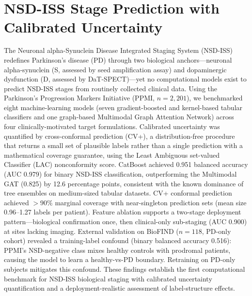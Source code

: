 
\chapter{NSD-ISS Stage Prediction with Calibrated Uncertainty}
\label{ch:paper1}\label{p1:ch:paper1}

The Neuronal alpha-Synuclein Disease Integrated Staging System (NSD-ISS) redefines Parkinson's disease (PD) through two biological anchors---neuronal alpha-synuclein (S, assessed by seed amplification assay) and dopaminergic dysfunction (D, assessed by DaT-SPECT)---yet no computational models exist to predict NSD-ISS stages from routinely collected clinical data. Using the Parkinson's Progression Markers Initiative (PPMI, $n{=}2{,}201$), we benchmarked eight machine-learning models (seven gradient-boosted and kernel-based tabular classifiers and one graph-based Multimodal Graph Attention Network) across four clinically-motivated target formulations. Calibrated uncertainty was quantified by cross-conformal prediction (CV+), a distribution-free procedure that returns a small set of plausible labels rather than a single prediction with a mathematical coverage guarantee, using the Least Ambiguous set-valued Classifier (LAC) nonconformity score. CatBoost achieved 0.951 balanced accuracy (AUC 0.979) for binary NSD-ISS classification, outperforming the Multimodal GAT (0.825) by 12.6 percentage points, consistent with the known dominance of tree ensembles on medium-sized tabular datasets. CV+ conformal prediction achieved $>90\%$ marginal coverage with near-singleton prediction sets (mean size 0.96--1.27 labels per patient). Feature ablation supports a two-stage deployment pattern---biological confirmation once, then clinical-only sub-staging (AUC 0.900) at sites lacking imaging. External validation on BioFIND ($n{=}118$, PD-only cohort) revealed a training-label confound (binary balanced accuracy 0.516): PPMI's NSD-negative class mixes healthy controls with prodromal patients, causing the model to learn a healthy-vs-PD boundary. Retraining on PD-only subjects mitigates this confound. These findings establish the first computational benchmark for NSD-ISS biological staging with calibrated uncertainty quantification and a deployment-realistic assessment of label-structure effects.

